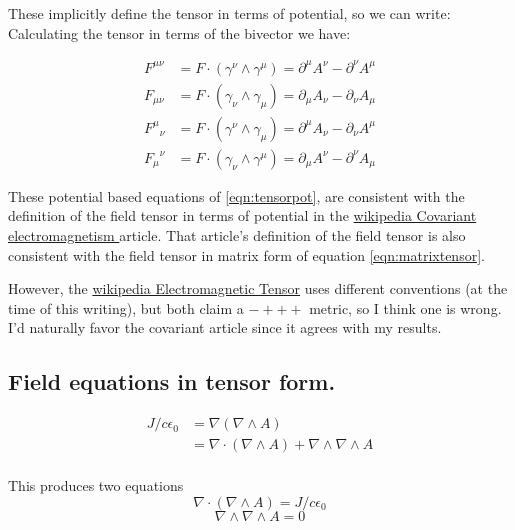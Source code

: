 \documentclass{article}
\newcommand{\grad}[0]{\nabla}
\begin{document}
These implicitly define the tensor in terms of potential, so we can write:
Calculating the tensor in terms of the bivector we have:

\begin{align}\label{eqn:tensorpot}
F^{\mu\nu} &= F \cdot (\gamma^{\nu} \wedge \gamma^{\mu}) = \partial^{\mu} A^{\nu} - \partial^{\nu} A^{\mu} \\
F_{\mu\nu} &= F \cdot (\gamma_{\nu} \wedge \gamma_{\mu}) = \partial_{\mu} A_{\nu} - \partial_{\nu} A_{\mu} \\
{F^{\mu}}_{\nu} &= F \cdot (\gamma^{\nu} \wedge \gamma_{\mu}) = \partial^{\mu} A_{\nu} - \partial_{\nu} A^{\mu} \\
{F_{\mu}}^{\nu} &= F \cdot (\gamma_{\nu} \wedge \gamma^{\mu}) = \partial_{\mu} A^{\nu} - \partial^{\nu} A_{\mu}
\end{align}

These potential based equations of \ref{eqn:tensorpot}, are consistent with the definition of the field tensor in terms of potential in the 
\href{http://en.wikipedia.org/wiki/Covariant\_formulation\_of\_classical\_electromagnetism}{ wikipedia Covariant electromagnetism } article.
That article's definition of the field tensor is also consistent with the field tensor in matrix form of equation \ref{eqn:matrixtensor}.

However, the \href{http://en.wikipedia.org/wiki/Electromagnetic_tensor}{wikipedia Electromagnetic Tensor}
uses different conventions (at the time of this writing), but both claim a $-+++$ metric, so I think one is wrong.  I'd naturally favor the
covariant article since it agrees with my results.

\subsection{ Field equations in tensor form. }

\begin{align*}
J/c \epsilon_0 
&= \grad (\grad \wedge A) \\
&= \grad \cdot ( \grad \wedge A ) + \grad \wedge \grad \wedge A \\
\end{align*}

This produces two equations
\begin{equation*}
\grad \cdot ( \grad \wedge A ) = J/c \epsilon_0 
\end{equation*}
\begin{equation*}
\grad \wedge \grad \wedge A = 0
\end{equation*}
\end{document}
